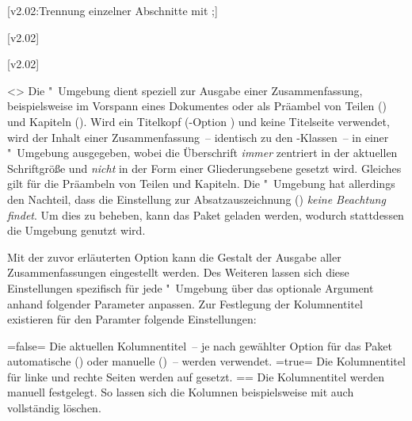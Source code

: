 \begin{DeclareEntity*}{}
\begin{DeclareEntity*}{}
\begin{DeclareEntity*}{}
\begin{Declaration}
  {}
  [v2.02:Trennung einzelner Abschnitte mit ;]
\begin{Declaration}
  {}
\begin{Declaration}
  {}
\begin{Declaration}
  {}
  [v2.02]
\begin{Declaration}
  {}
  [v2.02]
\begin{Declaration}
  {}
\begin{Declaration}
  {}
  <>
\printdeclarationlist
Die "~Umgebung dient speziell zur Ausgabe einer 
Zusammenfassung, beispielsweise im Vorspann eines Dokumentes oder als Präambel 
von Teilen () und Kapiteln (). 
Wird ein Titelkopf (\KOMAScript-Option ) und keine 
Titelseite verwendet, wird der Inhalt einer Zusammenfassung~-- identisch zu den 
\KOMAScript-Klassen~-- in einer "~Umgebung ausgegeben, 
wobei die Überschrift \emph{immer} zentriert in der aktuellen Schriftgröße und 
\emph{nicht} in der Form einer Gliederungsebene gesetzt wird. Gleiches gilt für 
die Präambeln von Teilen und Kapiteln. Die "~Umgebung 
hat allerdings den Nachteil, dass die Einstellung zur Absatzauszeichnung 
() \emph{keine Beachtung findet}. Um dies zu beheben, 
kann das Paket  geladen werden, wodurch stattdessen die 
Umgebung  genutzt wird.

Mit der zuvor erläuterten Option  kann die Gestalt der Ausgabe 
aller Zusammenfassungen eingestellt werden. Des Weiteren lassen sich diese 
Einstellungen spezifisch für jede "~Umgebung über das 
optionale Argument anhand folgender Parameter anpassen. 
%
%
Zur Festlegung der Kolumnentitel existieren für den Paramter 
 folgende Einstellungen:%
%
\begin{DeclareValues}
\itemval=false=
  Die aktuellen Kolumnentitel~-- je nach gewählter Option für das Paket 
   automatische () oder manuelle 
  ()~-- werden verwendet.
\itemval*=true=
  Die Kolumnentitel für linke und rechte Seiten werden auf  
  gesetzt.
\itemval==
  Die Kolumnentitel werden manuell festgelegt. So lassen sich die Kolumnen 
  beispielsweise mit  auch 
  vollständig löschen. 
\end{DeclareValues}


\end{Declaration}
\end{Declaration}
\end{Declaration}
\end{Declaration}
\end{Declaration}
\end{Declaration}
\end{Declaration}
\end{DeclareEntity*}
\end{DeclareEntity*}
\end{DeclareEntity*}
